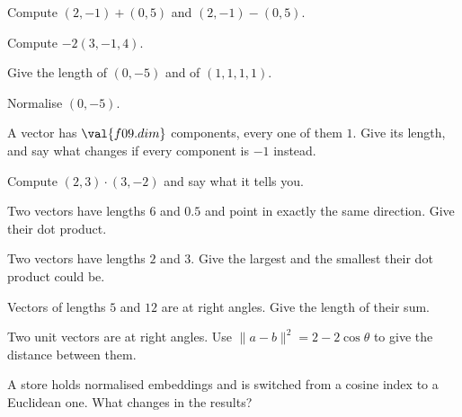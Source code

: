 \begin{testexercises}
\item Compute $(2, -1) + (0, 5)$ and $(2, -1) - (0, 5)$.
\item Compute $-2(3, -1, 4)$.
\item Give the length of $(0, -5)$ and of $(1, 1, 1, 1)$.
\item Normalise $(0, -5)$.
\item A vector has $\val{f09.dim}$ components, every one of them $1$. Give its
  length, and say what changes if every component is $-1$ instead.
\item Compute $(2, 3) \cdot (3, -2)$ and say what it tells you.
\item Two vectors have lengths $6$ and $\num{0.5}$ and point in exactly the
  same direction. Give their dot product.
\item Two vectors have lengths $2$ and $3$. Give the largest and the smallest
  their dot product could be.
\item Vectors of lengths $5$ and $12$ are at right angles. Give the length of
  their sum.
\item Two unit vectors are at right angles. Use
  $\lVert a - b \rVert^{2} = 2 - 2\cos\theta$ to give the distance between
  them.
\item A store holds normalised embeddings and is switched from a cosine index
  to a Euclidean one. What changes in the results?
\end{testexercises}
